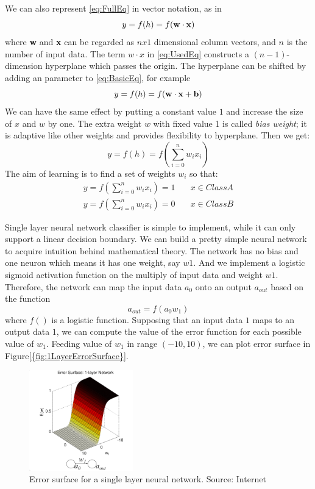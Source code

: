 We can also represent \ref{eq:FullEq} in vector notation, as in 
\begin{equation}\label{eq:UsedEq}
y = f(h) = f(\bf w \cdot x)
\end{equation}
where \textbf{w} and \textbf{x} can be regarded as $nx1$ dimensional column vectors, and $n$ is the number of input data.
The term $w \cdot x$ in \ref{eq:UsedEq} constructs a $(n-1)$-dimension hyperplane which passes the origin. The hyperplane can be shifted by adding an parameter to \ref{eq:BasicEq}, for example
\begin{equation}\label{eq:WithBias}
y = f(h) = f(\bf w \cdot x + b)
\end{equation}
We can have the same effect by putting a constant value $1$ and increase the size of $x$ and $w$ by one. The extra weight $w$ with fixed value 1 is called \textit{bias weight}; it is adaptive like other weights and provides flexibility to hyperplane. Then we get:
\begin{equation}\label{eq:finalEq}
y = f(h) = f(\sum_{i=0}^{n}w_{i}x_{i})
\end{equation}
The aim of learning is to find a set of weights $w_{i}$ so that:
\begin{align*}
y = f(\sum_{i=0}^{n}w_{i}x_{i}) = 1  & \quad x \in Class A\\
y = f(\sum_{i=0}^{n}w_{i}x_{i}) = 0  & \quad x \in Class B
\end{align*}

Single layer neural network classifier is simple to implement, while it can only support a linear decision boundary. We can build a pretty simple neural network to acquire intuition behind mathematical theory. The network has no bias and one neuron which means it has one weight, say $w1$. And we implement a logistic sigmoid activation function on the multiply of input data and weight $w1$. Therefore, the network can map the input data $a_0$ onto an output $a_{out}$ based on the function
\begin{equation}\label{eq:1LayerExample}
a_{out} = f(a_{0}w_{1})
\end{equation}
where $f()$ is a logistic function. Supposing that an input data $1$ maps to an output data $1$, we can compute the value of the error function for each possible value of $w_{1}$. Feeding value of $w_{1}$ in range $(-10,10)$, we can plot error surface in Figure\ref{{fig:1LayerErrorSurface}}.
\graphicspath{ {./Figures/} }
\begin{figure}[!htb]
\centering
\includegraphics[width=0.4\textwidth]{1LayerErrorSurface.png}
\caption{\label{fig:1LayerErrorSurface}Error surface for a single layer neural network. Source: Internet}
\end{figure}

